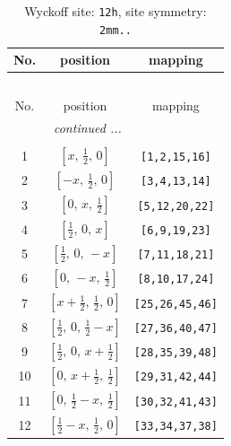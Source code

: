 \documentclass[fleqn,8pt]{jsarticle}
\begin{document}
\begin{longtable}{ccc}
\caption{Wyckoff site: {\tt 12h}, site symmetry: {\tt 2mm..}}
 \\
 \hline \hline
No. & position & mapping \\ \hline \endfirsthead

\multicolumn{2}{l}{\tablename\ \thetable{}} \\
 \hline \hline
No. & position & mapping \\ \hline \endhead

 \hline \hline
\multicolumn{2}{r}{\footnotesize\it continued ...} \\ \endfoot

 \hline \hline
\multicolumn{2}{r}{} \\ \endlastfoot

1 & $\left[ x,\, \frac{1}{2},\, 0 \right]$ & {\tt [1,2,15,16]} \\ \hline
2 & $\left[ - x,\, \frac{1}{2},\, 0 \right]$ & {\tt [3,4,13,14]} \\ \hline
3 & $\left[ 0,\, x,\, \frac{1}{2} \right]$ & {\tt [5,12,20,22]} \\ \hline
4 & $\left[ \frac{1}{2},\, 0,\, x \right]$ & {\tt [6,9,19,23]} \\ \hline
5 & $\left[ \frac{1}{2},\, 0,\, - x \right]$ & {\tt [7,11,18,21]} \\ \hline
6 & $\left[ 0,\, - x,\, \frac{1}{2} \right]$ & {\tt [8,10,17,24]} \\ \hline
7 & $\left[ x + \frac{1}{2},\, \frac{1}{2},\, 0 \right]$ & {\tt [25,26,45,46]} \\ \hline
8 & $\left[ \frac{1}{2},\, 0,\, \frac{1}{2} - x \right]$ & {\tt [27,36,40,47]} \\ \hline
9 & $\left[ \frac{1}{2},\, 0,\, x + \frac{1}{2} \right]$ & {\tt [28,35,39,48]} \\ \hline
10 & $\left[ 0,\, x + \frac{1}{2},\, \frac{1}{2} \right]$ & {\tt [29,31,42,44]} \\ \hline
11 & $\left[ 0,\, \frac{1}{2} - x,\, \frac{1}{2} \right]$ & {\tt [30,32,41,43]} \\ \hline
12 & $\left[ \frac{1}{2} - x,\, \frac{1}{2},\, 0 \right]$ & {\tt [33,34,37,38]} \\
\end{longtable}
\renewcommand{\arraystretch}{1.2}
\end{document}
